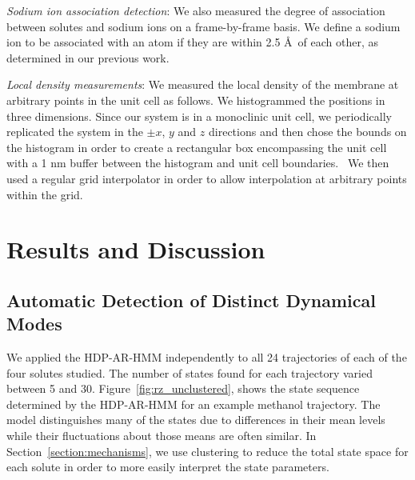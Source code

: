 \documentclass[journal=jpcbfk,manuscript=article]{achemso}
\begin{document}
  \textit{Sodium ion association detection}: We also measured the degree of association
  between solutes and sodium ions on a frame-by-frame basis. We define a sodium ion to
  be associated with an atom if they are within 2.5 \AA~of each other, as determined 
  in our previous work.~\cite{coscia_chemically_2019}
  
  \textit{Local density measurements}: We measured the local density of the membrane at
  arbitrary points in the unit cell as follows. We histogrammed the positions in three 
  dimensions. Since our system is in a monoclinic unit cell, we periodically replicated
  the system in the $\pm x$, $y$ and $z$ directions and then chose the bounds on the
  histogram in order to create a rectangular box encompassing the unit cell with
  a 1 nm buffer between the histogram and unit cell boundaries.~\cite{van_der_walt_numpy_2011}
  We then used a regular grid interpolator in order to allow interpolation at arbitrary
  points within the grid.~\cite{virtanen_scipy_2020} 

  \section{Results and Discussion}
  
  \subsection{Automatic Detection of Distinct Dynamical Modes}\label{section:find_modes}
  
  We applied the HDP-AR-HMM independently to all 24 trajectories of each of the four solutes studied.
  The number of states found for each trajectory varied between 5 and 30.  %
  Figure~\ref{fig:rz_unclustered}, shows the state sequence determined by the HDP-AR-HMM for
  an example methanol trajectory. The model distinguishes many of the states due to 
  differences in their mean levels while their fluctuations about those means are often 
  similar. In Section~\ref{section:mechanisms}, we use clustering to reduce the total state
  space for each solute in order to more easily interpret the state parameters.
  
\end{document}
